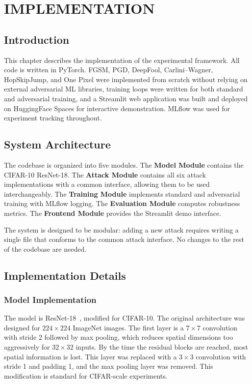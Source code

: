 \chapter{IMPLEMENTATION}
\label{ch:implementation}

\section{Introduction}

This chapter describes the implementation of the experimental framework. All code is written in PyTorch. FGSM, PGD, DeepFool, Carlini--Wagner, HopSkipJump, and One Pixel were implemented from scratch without relying on external adversarial ML libraries, training loops were written for both standard and adversarial training, and a Streamlit web application was built and deployed on HuggingFace Spaces for interactive demonstration. MLflow was used for experiment tracking throughout.

\section{System Architecture}

The codebase is organized into five modules. The \textbf{Model Module} contains the CIFAR-10 ResNet-18. The \textbf{Attack Module} contains all six attack implementations with a common interface, allowing them to be used interchangeably. The \textbf{Training Module} implements standard and adversarial training with MLflow logging. The \textbf{Evaluation Module} computes robustness metrics. The \textbf{Frontend Module} provides the Streamlit demo interface.

The system is designed to be modular: adding a new attack requires writing a single file that conforms to the common attack interface. No changes to the rest of the codebase are needed.

\section{Implementation Details}

\subsection{Model Implementation}

The model is ResNet-18~\cite{he2016deep}, modified for CIFAR-10. The original architecture was designed for $224 \times 224$ ImageNet images. The first layer is a $7 \times 7$ convolution with stride 2 followed by max pooling, which reduces spatial dimensions too aggressively for $32 \times 32$ inputs. By the time the residual blocks are reached, most spatial information is lost. This layer was replaced with a $3 \times 3$ convolution with stride 1 and padding 1, and the max pooling layer was removed. This modification is standard for CIFAR-scale experiments.

